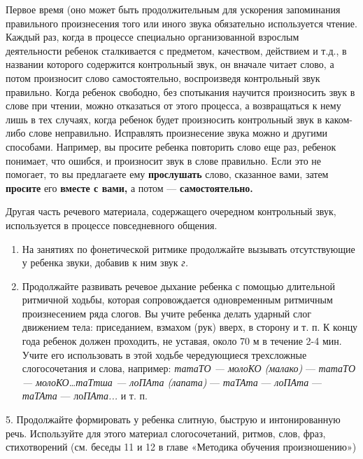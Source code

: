 \documentclass[a5paper]{book}
\renewcommand{\emph}[1]{\textit{#1}}
\begin{document}
Первое время (оно может быть продолжительным для ускорения запоминания
правильного произнесения того или иного звука обязательно используется
чтение. Каждый раз, когда в процессе специально организованной взрослым
деятельности ребенок сталкивается с предметом, качеством, действием и
т.д., в названии которого содержится контрольный звук, он вначале читает
слово, а потом произносит слово самостоятельно, воспроизведя контрольный
звук правильно. Когда ребенок свободно, без спотыкания научится
произносить звук в слове при чтении, можно отказаться от этого процесса,
а возвращаться к нему лишь в тех случаях, когда ребенок будет
произносить контрольный звук в каком-либо слове неправильно. Исправлять
произнесение звука можно и другими способами. Например, вы просите
ребенка повторить слово еще раз, ребенок понимает, что ошибся, и
произносит звук в слове правильно. Если это не помогает, то вы
предлагаете ему \textbf{прослушать} слово, сказанное вами, затем
\textbf{просите} его \textbf{вместе с вами,} а потом ---
\textbf{самостоятельно.}

Другая часть речевого материала, содержащего очередном контрольный звук,
используется в процессе повседневного общения.


\begin{enumerate}
\def\labelenumi{\arabic{enumi}.}
\setcounter{enumi}{2}
\item
  
  На занятиях по фонетической ритмике продолжайте вызывать отсутствующие
  у ребенка звуки, добавив к ним звук \emph{г.}
  
\item
  
  Продолжайте развивать речевое дыхание ребенка с помощью длительной
  ритмичной ходьбы, которая сопровождается одновременным ритмичным
  произнесением ряда слогов. Вы учите ребенка делать ударный слог
  движением тела: приседанием, взмахом (рук) вверх, в сторону и т. п. К
  концу года ребенок должен проходить, не уставая, около 70 м в течение
  2-4 мин. Учите его использовать в этой ходьбе чередующиеся трехсложные
  слогосочетания и слова, например: \emph{татаТО --- молоКО (малако)}
  --- \emph{татаТО --- молоКО}\ldots{}\emph{таТтша --- лоПАта (лапата)}
  --- \emph{таТАта} --- \emph{лоПАта} --- \emph{таТАта} ---
  ло\emph{ПАта...} и т. п.
  
\end{enumerate}


5. Продолжайте формировать у ребенка слитную, быструю и интонированную
речь. Используйте для этого материал слогосочетаний, ритмов, слов, фраз,
стихотворений (см. беседы 11 и 12 в главе «Методика обучения
произношению»)
\end{document}
